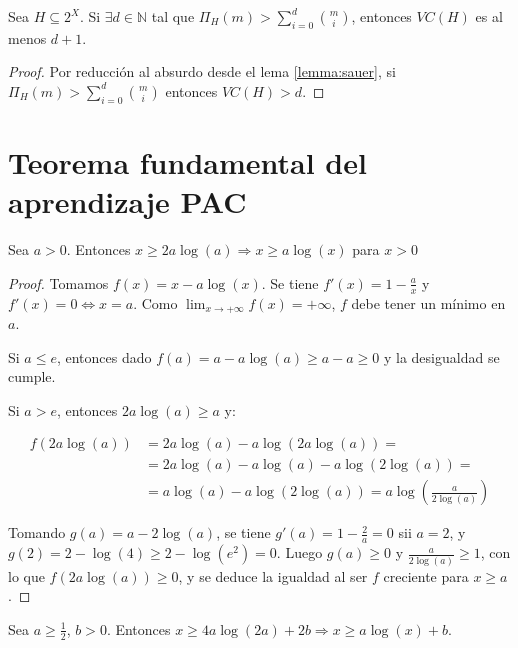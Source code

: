 \begin{corollary}
Sea $H \subseteq 2^X$. Si $\exists d\in \mathbb{N}$ tal que $\Pi_{H} (m) > \sum_{i=0}^d \binom{m}{i}$,
entonces $VC(H)$ es al menos $d+1$.
\end{corollary}

\begin{proof}
Por reducción al absurdo desde el lema \ref{lemma:sauer}, si $\Pi_{H}(m) > \sum_{i=0}^d \binom{m}{i}$ entonces $VC(H) > d$.
\end{proof}

\section{Teorema fundamental del aprendizaje PAC}

\begin{lemma}
 Sea $a > 0$. Entonces $x \ge 2a \log(a) \Rightarrow x \ge a \log(x)$ para $x > 0$
 \label{lemma:ineqlog}
\end{lemma}

\begin{proof}
 Tomamos $f(x) = x - a\log(x)$. Se tiene $f'(x) = 1 - \frac{a}{x}$ y $f'(x) = 0 \Leftrightarrow x = a$. Como 
 $\lim_{x\rightarrow +\infty}f(x) = +\infty$, $f$ debe tener un mínimo en $a$.
 
 Si $a \le e$, entonces dado $f(a) = a-a \log(a) \ge a-a \ge 0$ y la desigualdad se cumple.
 
 Si $a > e$, entonces $2a \log(a) \ge a$ y:
 
 \begin{align*}
  f(2a \log(a)) &= 2a \log(a) - a \log(2a \log(a)) = \\
	        &= 2a \log(a) - a \log(a) - a \log(2\log(a)) =\\
                &= a \log(a) - a \log(2 \log(a)) = a \log \left(\frac{a}{2 \log(a)}\right)
 \end{align*}
 
 Tomando $g(a) = a - 2\log(a)$, se tiene $g'(a) = 1 - \frac{2}{a} = 0$ sii $a = 2$, y $g(2) = 2 - \log(4) \ge 2 - \log(e^2) = 0$.
 Luego $g(a) \ge 0$ y $\frac{a}{2 \log(a)} \ge 1$, con lo que $f(2a \log(a)) \ge 0$, y se deduce la igualdad al ser $f$
 creciente para $x\ge a$.
\end{proof}


\begin{lemma}
 Sea $a \ge \frac{1}{2}$, $b > 0$. Entonces $x\ge 4a \log(2a) + 2b \Rightarrow x \ge a \log(x) + b$.
 \label{lemma:boundlog}
\end{lemma}

